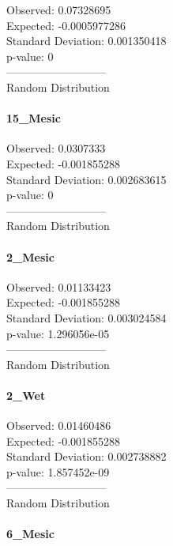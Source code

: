 \documentclass[
]{article}
\begin{document}
Observed: 0.07328695\\
Expected: -0.0005977286\\
Standard Deviation: 0.001350418\\
p-value: 0\\
---------------------------\\
Random Distribution

\hypertarget{mesic-1}{%
\paragraph{15\_Mesic}\label{mesic-1}}

Observed: 0.0307333\\
Expected: -0.001855288\\
Standard Deviation: 0.002683615\\
p-value: 0\\
---------------------------\\
Random Distribution

\hypertarget{mesic-2}{%
\paragraph{2\_Mesic}\label{mesic-2}}

Observed: 0.01133423\\
Expected: -0.001855288\\
Standard Deviation: 0.003024584\\
p-value: 1.296056e-05\\
---------------------------\\
Random Distribution

\hypertarget{wet}{%
\paragraph{2\_Wet}\label{wet}}

Observed: 0.01460486\\
Expected: -0.001855288\\
Standard Deviation: 0.002738882\\
p-value: 1.857452e-09\\
---------------------------\\
Random Distribution

\hypertarget{mesic-3}{%
\paragraph{6\_Mesic}\label{mesic-3}}
\end{document}
